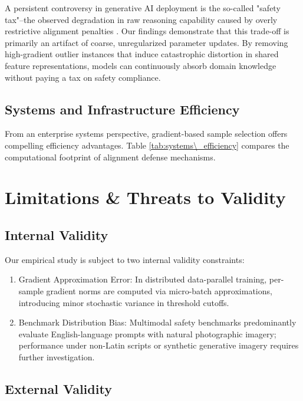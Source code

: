 \documentclass[10pt,journal,compsoc,twocolumn]{IEEEtran}
\begin{document}
\begin{table}[t]
\begin{table}[t]
A persistent controversy in generative AI deployment is the so-called "safety tax"--the observed degradation in raw reasoning capability caused by overly restrictive alignment penalties \cite{arxiv_2406_00584}. Our findings demonstrate that this trade-off is primarily an artifact of coarse, unregularized parameter updates. By removing high-gradient outlier instances that induce catastrophic distortion in shared feature representations, models can continuously absorb domain knowledge without paying a tax on safety compliance.


\subsection{Systems and Infrastructure Efficiency}

From an enterprise systems perspective, gradient-based sample selection offers compelling efficiency advantages. Table \ref{tab:systems\_efficiency} compares the computational footprint of alignment defense mechanisms.






\section{Limitations \& Threats to Validity}



\subsection{Internal Validity}

Our empirical study is subject to two internal validity constraints:
\begin{enumerate}
  \item Gradient Approximation Error: In distributed data-parallel training, per-sample gradient norms are computed via micro-batch approximations, introducing minor stochastic variance in threshold cutoffs.
  \item Benchmark Distribution Bias: Multimodal safety benchmarks predominantly evaluate English-language prompts with natural photographic imagery; performance under non-Latin scripts or synthetic generative imagery requires further investigation.
\end{enumerate}


\subsection{External Validity}


\end{table}
\end{table}
\end{document}

